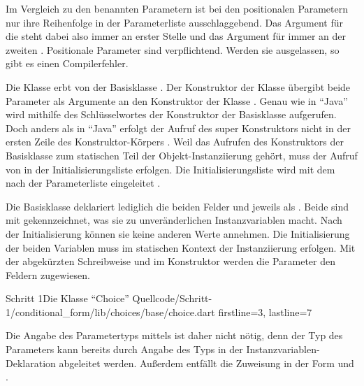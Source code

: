 Im Vergleich zu den benannten Parametern ist bei den positionalen Parametern nur ihre Reihenfolge in der Parameterliste ausschlaggebend.
Das Argument für die  steht dabei also immer an erster Stelle und das Argument für  immer an der zweiten .
Positionale Parameter sind verpflichtend.
Werden sie ausgelassen, so gibt es einen Compilerfehler.

Die Klasse  erbt von der Basisklasse  .
Der Konstruktor der Klasse  übergibt beide Parameter als Argumente an den Konstruktor der Klasse .
Genau wie in \enquote{Java} wird mithilfe des Schlüsselwortes  der Konstruktor der Basisklasse aufgerufen.
Doch anders als in \enquote{Java} erfolgt der Aufruf des super Konstruktors nicht in der ersten Zeile des Konstruktor-Körpers .
Weil das Aufrufen des Konstruktors der Basisklasse zum statischen Teil der Objekt-Instanziierung gehört, muss der Aufruf von  in der Initialisierungsliste erfolgen.
Die Initialisierungsliste wird mit dem \IC{:} nach der Parameterliste eingeleitet .

Die Basisklasse  \Lst{\ref{lst:Schritt1KlasseChoice}} deklariert lediglich die beiden Felder  und  jeweils als  .
Beide sind mit  gekennzeichnet, was sie zu unveränderlichen Instanzvariablen macht.
Nach der Initialisierung können sie keine anderen Werte annehmen.
 Die Initialisierung der beiden Variablen muss im statischen Kontext der Instanziierung erfolgen.
Mit der abgekürzten Schreibweise  und   im Konstruktor  werden die Parameter den Feldern zugewiesen.

\begin{alexlisting}{Schritt 1}{Die Klasse \enquote{Choice}}
  {Quellcode/Schritt-1/conditional_form/lib/choices/base/choice.dart}
  {firstline=3, lastline=7}
  \label{lst:Schritt1KlasseChoice}
\end{alexlisting}

Die Angabe des Parametertyps mittels  ist daher nicht nötig,
denn der Typ des Parameters kann bereits durch Angabe des Typs in der Instanzvariablen-Deklaration  abgeleitet werden.
Außerdem entfällt die Zuweisung in der Form  und
.

